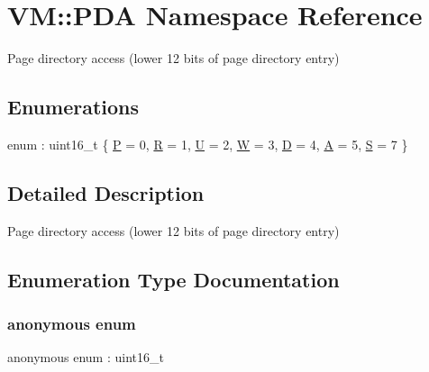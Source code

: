 \hypertarget{namespace_v_m_1_1_p_d_a}{}\section{VM\+:\+:P\+DA Namespace Reference}
\label{namespace_v_m_1_1_p_d_a}


Page directory access (lower 12 bits of page directory entry)  


\subsection*{Enumerations}
\begin{DoxyCompactItemize}
\item 
enum \+: uint16\+\_\+t \{ \newline
\hyperlink{namespace_v_m_1_1_p_d_a_aef2fe9b88f7669a048ee22c1e6e2311ba2f8ff50210f87689944543ed655971cb}{P} = 0, 
\hyperlink{namespace_v_m_1_1_p_d_a_aef2fe9b88f7669a048ee22c1e6e2311ba80249bc62c8a67e157d2b13cdf4325f7}{R} = 1, 
\hyperlink{namespace_v_m_1_1_p_d_a_aef2fe9b88f7669a048ee22c1e6e2311bad295b7d3bddcf79dc55d6e5c90423c2b}{U} = 2, 
\hyperlink{namespace_v_m_1_1_p_d_a_aef2fe9b88f7669a048ee22c1e6e2311ba8a740302ea12c8d4c4d5a47ac1af683f}{W} = 3, 
\newline
\hyperlink{namespace_v_m_1_1_p_d_a_aef2fe9b88f7669a048ee22c1e6e2311ba6243d3f10651bfe05301f7cdfafaa6aa}{D} = 4, 
\hyperlink{namespace_v_m_1_1_p_d_a_aef2fe9b88f7669a048ee22c1e6e2311ba55148405937cb89c60ff92caaadf8dfa}{A} = 5, 
\hyperlink{namespace_v_m_1_1_p_d_a_aef2fe9b88f7669a048ee22c1e6e2311ba46023444e176bb33206552f231471c37}{S} = 7
 \}
\end{DoxyCompactItemize}


\subsection{Detailed Description}
Page directory access (lower 12 bits of page directory entry) 

\subsection{Enumeration Type Documentation}
\mbox{\label{namespace_v_m_1_1_p_d_a_aef2fe9b88f7669a048ee22c1e6e2311b}} 
\subsubsection{\texorpdfstring{anonymous enum}{anonymous enum}}
{\footnotesize\ttfamily anonymous enum \+: uint16\+\_\+t}


